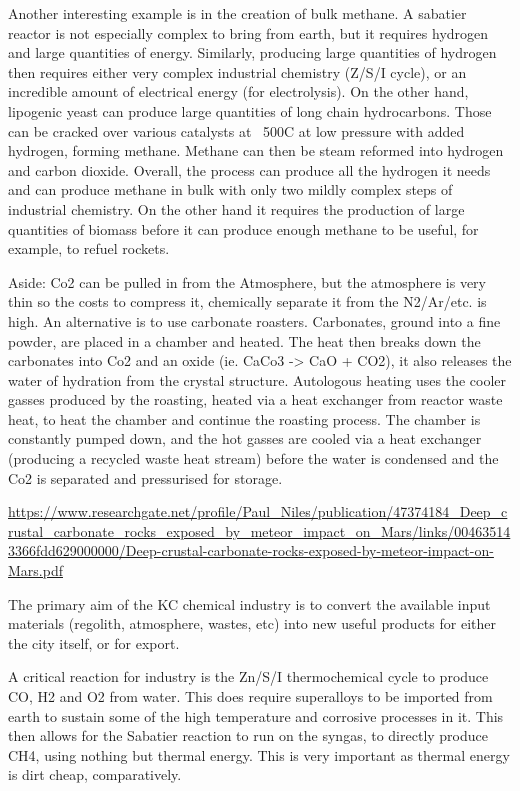 \documentclass[10pt]{article}
\begin{document}
Another interesting example is in the creation of bulk methane. A sabatier reactor is not especially complex to bring from earth, but it requires hydrogen and large quantities of energy. Similarly, producing large quantities of hydrogen then requires either very complex industrial chemistry (Z/S/I cycle), or an incredible amount of electrical energy (for electrolysis). On the other hand, lipogenic yeast can produce large quantities of long chain hydrocarbons. Those can be cracked over various catalysts at ~500C at low pressure with added hydrogen, forming methane. Methane can then be steam reformed into hydrogen and carbon dioxide. Overall, the process can produce all the hydrogen it needs and can produce methane in bulk with only two mildly complex steps of industrial chemistry. On the other hand it requires the production of large quantities of biomass before it can produce enough methane to be useful, for example, to refuel rockets.


Aside:
Co2 can be pulled in from the Atmosphere, but the atmosphere is very thin so the costs to compress it, chemically separate it from the N2/Ar/etc. is high. An alternative is to use carbonate roasters. Carbonates, ground into a fine powder, are placed in a chamber and heated. The heat then breaks down the carbonates into Co2 and an oxide (ie. CaCo3 -> CaO + CO2), it also releases the water of hydration from the crystal structure. Autologous heating uses the cooler gasses produced by the roasting, heated via a heat exchanger from reactor waste heat, to heat the chamber and continue the roasting process. The chamber is constantly pumped down, and the hot gasses are cooled via a heat exchanger (producing a recycled waste heat stream) before the water is condensed and the Co2 is separated and pressurised for storage.

\url{https://www.researchgate.net/profile/Paul_Niles/publication/47374184_Deep_crustal_carbonate_rocks_exposed_by_meteor_impact_on_Mars/links/004635143366fdd629000000/Deep-crustal-carbonate-rocks-exposed-by-meteor-impact-on-Mars.pdf}


The primary aim of the KC chemical industry is to convert the available input materials (regolith, atmosphere, wastes, etc) into new useful products for either the city itself, or for export.

A critical reaction for industry is the Zn/S/I thermochemical cycle to produce CO, H2 and O2 from water. This does require superalloys to be imported from earth to sustain some of the high temperature and corrosive processes in it. This then allows for the Sabatier reaction to run on the syngas, to directly produce CH4, using nothing but thermal energy. This is very important as thermal energy is dirt cheap, comparatively.
\end{document}
